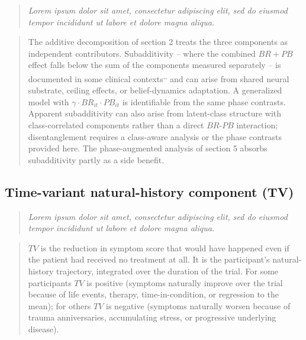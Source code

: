 \documentclass[
  11pt,
]{article}
\newenvironment{rgt}{%
  \begin{quote}\small\itshape\color[RGB]{20,60,160}}{%
  \end{quote}}
\newenvironment{orig}{%
  \begin{quote}\normalsize\color[gray]{0.55}}{%
  \end{quote}}
\begin{document}
\begin{rgt}
Lorem ipsum dolor sit amet, consectetur adipiscing elit, sed do eiusmod tempor incididunt ut labore et dolore magna aliqua.

\end{rgt}

\begin{orig}
The additive decomposition of section 2 treats the three
components as independent contributors. Subadditivity -- where
the combined \(BR + PB\) effect falls below the sum of the
components measured separately -- is documented in some clinical
contexts\textsuperscript{,,}
and can arise from shared neural substrate, ceiling effects, or
belief-dynamics adaptation. A generalized model with
\(\gamma \cdot BR_{it} \cdot PB_{it}\) is identifiable from the
same phase contrasts. Apparent subadditivity can also arise from
latent-class structure with class-correlated components rather
than a direct \(BR\)-\(PB\) interaction; disentanglement requires a
class-aware analysis or the phase contrasts provided here. The
phase-augmented analysis of section 5 absorbs subadditivity
partly as a side benefit.

\end{orig}

\subsection{Time-variant natural-history component (TV)}\label{time-variant-natural-history-component-tv}

\begin{rgt}
Lorem ipsum dolor sit amet, consectetur adipiscing elit, sed do eiusmod tempor incididunt ut labore et dolore magna aliqua.

\end{rgt}

\begin{orig}
\(TV\) is the reduction in symptom score that would have happened
even if the patient had received no treatment at all. It is the
participant's natural-history trajectory, integrated over the
duration of the trial. For some participants \(TV\) is positive
(symptoms naturally improve over the trial because of life
events, therapy, time-in-condition, or regression to the mean);
for others \(TV\) is negative (symptoms naturally worsen because
of trauma anniversaries, accumulating stress, or progressive
underlying disease).

\end{orig}
\end{document}
